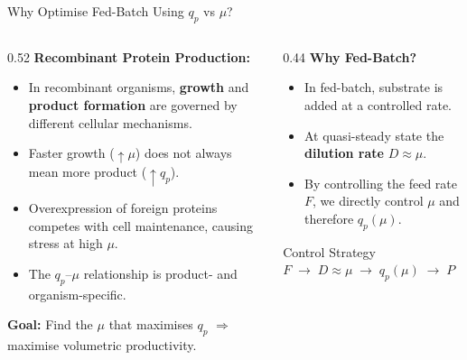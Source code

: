 \documentclass[aspectratio=169, 11pt]{beamer}
\begin{document}
\begin{frame}{Why Optimise Fed-Batch Using $q_p$ vs $\mu$?}
  \begin{columns}[T]
    \begin{column}{0.52\textwidth}
      \textbf{Recombinant Protein Production:}
      \begin{itemize}
        \item In recombinant organisms, \textbf{growth} and \textbf{product formation}
              are governed by different cellular mechanisms.
        \item Faster growth ($\uparrow\mu$) does not always mean more product ($\uparrow q_p$).
        \item Overexpression of foreign proteins competes with cell maintenance,
              causing stress at high $\mu$.
        \item The $q_p$--$\mu$ relationship is product- and organism-specific.
      \end{itemize}

      \vspace{0.15cm}
      \textbf{Goal:} Find the $\mu$ that maximises $q_p$
      $\Rightarrow$ maximise volumetric productivity.
    \end{column}
    \begin{column}{0.44\textwidth}
      \textbf{Why Fed-Batch?}
      \begin{itemize}
        \item In fed-batch, substrate is added at a controlled rate.
        \item At quasi-steady state the \textbf{dilution rate} $D \approx \mu$.
        \item By controlling the feed rate $F$, we directly control $\mu$
              and therefore $q_p(\mu)$.
      \end{itemize}

      \vspace{0.15cm}
      \begin{block}{Control Strategy}
        \centering
        $F \;\rightarrow\; D \approx \mu \;\rightarrow\; q_p(\mu) \;\rightarrow\; P$
      \end{block}

    \end{column}
  \end{columns}
\end{frame}
\end{document}
